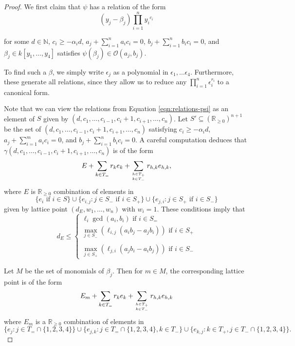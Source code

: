 \documentclass{amsart}
\theoremstyle{plain}
\theoremstyle{definition}
\theoremstyle{remark}
\numberwithin{equation}{section}
\newcommand\bida{a}
\newcommand\bidb{b}
\begin{document}
\begin{proof}
We first claim that $\psi$ has a relation of the form
\begin{equation}\label{eqn:relations-psi}
	(y_j - \beta_j)\prod_{i=1}^n {y_i}^{c_{i}}
\end{equation}

\noindent
for some $d\in \mathbb{N}$, $c_i \ge -\alpha_i d$, $\bida_j + \sum_{i = 1}
^n \bida_i c_i = 0$, $\bidb_j + \sum_{i=1}^n \bidb_i c_i = 0$, and $\beta_j \in
k[y_1, \ldots, y_4]$ satisfies $\psi(\beta_j)\in \mathscr{O}(\bida_j,
\bidb_j)$.

To find such a $\beta$, we simply write $\epsilon_j$ as a 
polynomial in $\epsilon_1, \ldots \epsilon _4$. Furthermore, these
generate all relations, since they allow us to reduce any $\prod_{i =
1}^n \epsilon_i^{r_i}$ to a canonical form. 

Note that we can view the relations from Equation
\ref{eqn:relations-psi} as an element of $S$ given
by $(d, c_1, \ldots, c_{i-1}, c_i + 1, c_{i+1}, \ldots , c_n)$.  Let $S'\subseteq (\mathbb{R}_{\ge 0})^{n+1}$ be the
set of $(d, c_1, \ldots, c_{i-1}, c_i + 1, c_{i+1}, \ldots , c_n)$ satisfying $c_i \ge -\alpha_i d$,
$\bida_j + \sum_{i = 1}^m \bida_i c_i = 0$, and $\bidb_j + \sum_{i=1}^n \bidb_i c_i
= 0$.  A careful computation deduces that $\gamma (d, c_1, \ldots, c_{i-1}, c_i + 1, c_{i+1}, \ldots, c_n)$ is of the form 
\[
	E + \sum_{k\in T_=} r_k e_k + \sum_{h\in T_+ \atop k\in T_-} r_{h,k} e_{h,k},
\] 
where $E$ is $\mathbb{R}_{\ge 0}$
combination of elements in 
\[
	\{e_i \mbox{ if } i\in S\} \cup \{e_{i,j}: j\in S_- \mbox{ if } i \in S_+\} \cup \{e_{j,i}: j\in S_+ \mbox{ if } i \in S_-\}
\]
given by lattice point $(d_E, w_1, \ldots, w_n)$ with $w_i = 1$.  These conditions imply that 
\[
	d_E \le \left\{ \begin{split}  \ell_i \gcd(\bida_i, \bidb_i) \mbox{ if } i \in S_= 
			\\ \max_{j\in S_-}(\ell_{i,j} (\bida_i \bidb_
j - \bida_j \bidb_i)) \mbox{ if } i\in S_+ \\
			\\ \max_{j\in S_+}(\ell_{j, i} (\bida_j \bidb_
i - \bida_i \bidb_j)) \mbox{ if } i \in S_- \end{split}  \right.
\]


Let $M$ be the set of monomials of $\beta_j$.  Then for $m\in M$, the corresponding lattice point is of the form
\[
	E_m + \sum_{k\in T_=} r_k e_k + \sum_{h\in T_+ \atop k\in T_-} r_{h,k} e_{h,k}
\]
where $E_m$ is a $\mathbb{R}_{\ge 0}$ combination of elements in
\[
	\{e_j : j\in T_= \cap \{1, 2, 3, 4\}\} \cup \{e_{j, k}: j\in T_= \cap \{1, 2, 3, 4\}, k\in T_-\} \cup \{e_{k,j}: k\in T_+, j\in T_- \cap \{1, 2, 3, 4\}\}.
\]

\end{proof}
\end{document}
